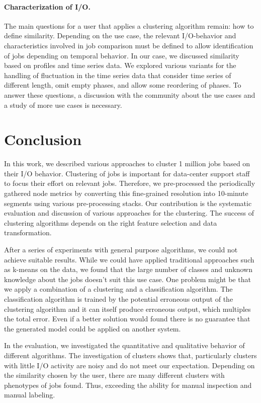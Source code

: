 \documentclass{jhps}
\begin{document}
{{{{\paragraph{Characterization of I/O.}
The main questions for a user that applies a clustering algorithm remain: how to define similarity.
Depending on the use case, the relevant I/O-behavior and characteristics involved in job comparison must be defined to allow identification of jobs depending on temporal behavior.
In our case, we discussed similarity based on profiles and time series data.
We explored various variants for the handling of fluctuation in the time series data that consider time series of different length, omit empty phases, and allow some reordering of phases.
To answer these questions, a discussion with the community about the use cases and a study of more use cases is necessary.


\section{Conclusion}%
\label{sec:conclusion}

In this work, we described various approaches to cluster 1 million jobs based on their I/O behavior.
Clustering of jobs is important for data-center support staff to focus their effort on relevant jobs.
Therefore, we pre-processed the periodically gathered node metrics by converting this fine-grained resolution into 10-minute segments using various pre-processing stacks.
Our contribution is the systematic evaluation and discussion of various approaches for the clustering.
The success of clustering algorithms depends on the right feature selection and data transformation.

After a series of experiments with general purpose algorithms, we could not achieve suitable results.
While we could have applied traditional approaches such as k-means on the data, we found that the large number of classes and unknown knowledge about the jobs doesn't suit this use case.
One problem might be that we apply a combination of a clustering and a classification algorithm.
The classification algorithm is trained by the potential erroneous output of the clustering algorithm and it can itself produce erroneous output, which multiples the total error.
Even if a better solution would found there is no guarantee that the generated model could be applied on another system.

In the evaluation, we investigated the quantitative and qualitative behavior of different algorithms.
The investigation of clusters shows that, particularly clusters with little I/O activity are noisy and do not meet our expectation.
Depending on the similarity chosen by the user, there are many different clusters with phenotypes of jobs found.
Thus, exceeding the ability for manual inspection and manual labeling.

}}}}
\end{document}

